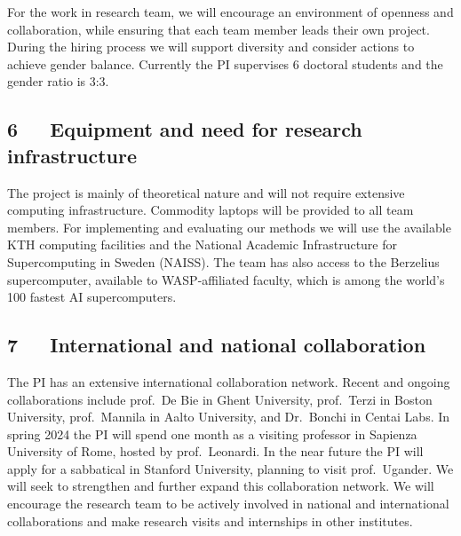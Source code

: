 \documentclass[a4paper,11pt]{article}
\begin{document}
For the work in research team, 
we will encourage an environment of openness and collaboration, 
while ensuring that each team member leads their own project.
%
During the hiring process we will support diversity and consider actions to achieve gender balance. 
Currently the PI supervises 6 doctoral students and the gender ratio is 3:3.




\subsection*{6~~~Equipment and need for research infrastructure}


The project is mainly of theoretical nature and will not require extensive computing infrastructure. 
Commodity laptops will be provided to all team members. 
For implementing and evaluating our methods we will use the available 
KTH computing facilities
and the National Academic Infrastructure for Supercomputing in Sweden (NAISS).
The team has also access to the Berzelius supercomputer, 
available to WASP-affiliated faculty, 
which is among the world's 100 fastest AI supercomputers.

\subsection*{7~~~International and national collaboration}


The PI has an extensive international collaboration network. 
Recent and ongoing collaborations include
prof.\ De Bie in Ghent University, 
prof.\ Terzi in Boston University,
prof.\ Mannila in Aalto University, and 
Dr.\ Bonchi in Centai Labs.
In spring 2024 the PI will spend one month as a visiting professor 
in Sapienza University of Rome, hosted by prof.\ Leonardi.
In the near future the PI will apply for a sabbatical in Stanford University, 
planning to visit prof.\ Ugander. 
We will seek to strengthen and further expand this collaboration network.
We will encourage the research team to be actively involved in national and international collaborations
and make research visits and internships in other institutes.
\end{document}
